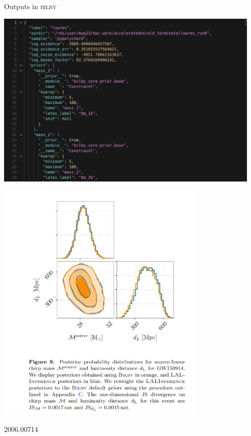 \documentclass[aspectratio=169]{beamer}
\begin{document}
\begin{frame}{Outputs in \textsc{bilby}}
    \begin{minipage}[]{0.5\textwidth}
    \centering
        \includegraphics[width=0.95\textwidth]{Ca_Foscari Beamer/bilby_evidence.png}
    \end{minipage}%
    \begin{minipage}[]{0.5\textwidth} \vspace{2em}
        \centering
        \includegraphics[width=0.75\textwidth]{Ca_Foscari Beamer/bilby_triangle.png}
    \end{minipage}
  \textcolor{cfgrey}{2006.00714}
\end{frame}
\end{document}
